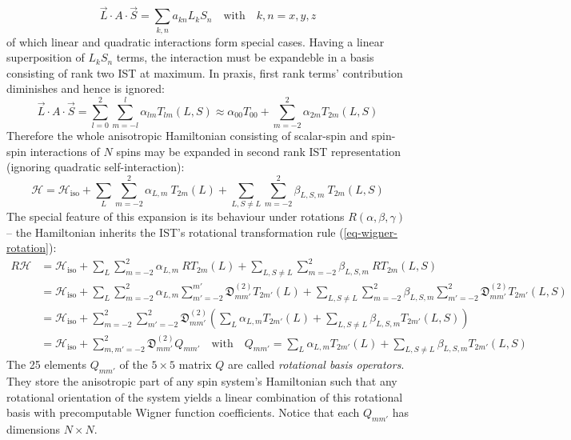 \documentclass[11.5pt,a4paper]{article}
\begin{document}
\begin{equation}
 \vec{L} \cdot A \cdot \vec{S} = \sum_{k,n} a_{kn} L_k S_n \quad \text{with} \quad  k,n = x,y,z
\end{equation}
of which linear and quadratic interactions form special cases. Having a linear superposition of $L_k S_n$ terms, the interaction must be expandeble in a basis consisting of rank two IST at maximum. In praxis, first rank terms' contribution diminishes and hence is ignored:
\begin{equation}
 \vec{L} \cdot A \cdot \vec{S} = \sum_{l=0}^2 \sum_{m=-l}^l \alpha_{lm} T_{lm} (L,S) \approx \alpha_{00} T_{00} + \sum_{m=-2}^2 \alpha_{2m} T_{2m}(L,S)
\end{equation}
Therefore the whole anisotropic Hamiltonian consisting of scalar-spin and spin-spin interactions of $N$ spins may be expanded in second rank IST representation (ignoring quadratic self-interaction):
\begin{equation}
 \mathcal{H} = \mathcal{H}_{\text{iso}} + \sum_L \sum_{m=-2}^2 \alpha_{L,m}\ T_{2m} (L) + \sum_{L,S\neq L} \sum_{m=-2}^{2} \beta_{L,S,m}\ T_{2m}(L,S)
\end{equation}
The special feature of this expansion is its behaviour under rotations $R(\alpha,\beta,\gamma)$ -- the Hamiltonian inherits the IST's rotational transformation rule (\ref{eq-wigner-rotation}):
\begin{align}
 R \mathcal{H} & = \mathcal{H}_\text{iso} +  \sum_L \sum_{m=-2}^2 \alpha_{L,m}\ R T_{2m} (L) + \sum_{L,S\neq L} \sum_{m=-2}^{2} \beta_{L,S,m}\ R T_{2m}(L,S) \\
  & = \mathcal{H}_\text{iso} +  \sum_L \sum_{m=-2}^2 \alpha_{L,m} \sum_{m'=-2}^{m'} \mathfrak{D}_{mm'}^{(2)} T_{2m'} (L) + \sum_{L,S\neq L} \sum_{m=-2}^{2} \beta_{L,S,m} \sum_{m'=-2}^{2} \mathfrak{D}_{mm'}^{(2)} T_{2m'}(L,S) \\
  & = \mathcal{H}_\text{iso} +  \sum_{m=-2}^2 \sum_{m'=-2}^{2} \mathfrak{D}_{mm'}^{(2)}  \left( \sum_L  \alpha_{L,m} T_{2m'} (L) + \sum_{L,S\neq L} \beta_{L,S,m} T_{2m'}(L,S) \right)\\
  & =  \mathcal{H}_\text{iso} +  \sum_{m,m'=-2}^{2} \mathfrak{D}_{mm'}^{(2)} Q_{mm'} \quad \text{with} \quad 
  Q_{mm'} = \sum_L  \alpha_{L,m} T_{2m'} (L) + \sum_{L,S\neq L} \beta_{L,S,m} T_{2m'}(L,S)
\end{align}
The 25 elements $Q_{mm'}$ of the $5\times 5$ matrix $Q$ are called \emph{rotational basis operators}. They store the anisotropic part of any spin system's Hamiltonian such that any rotational orientation of the system yields a linear combination of this rotational basis with precomputable Wigner function coefficients. Notice that each $Q_{mm'}$ has dimensions $N \times N$.  
\end{document}
